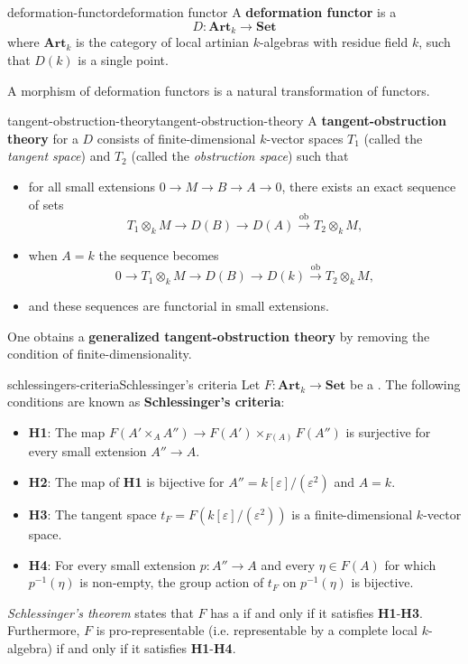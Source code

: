 \begin{topic}{deformation-functor}{deformation functor}
    A \textbf{deformation functor} is a 
    \[ D : \textbf{Art}_k \to \textbf{Set} \]
    where $\textbf{Art}_k$ is the category of local artinian $k$-algebras with residue field $k$, such that $D(k)$ is a single point.
    
    A morphism of deformation functors is a natural transformation of functors.
\end{topic}

\begin{topic}{tangent-obstruction-theory}{tangent-obstruction-theory}
    A \textbf{tangent-obstruction theory} for a  $D$ consists of finite-dimensional $k$-vector spaces $T_1$ (called the \textit{tangent space}) and $T_2$ (called the \textit{obstruction space}) such that
    \begin{itemize}
        \item for all small extensions $0 \to M \to B \to A \to 0$, there exists an exact sequence of sets
        \[ T_1 \otimes_k M \to D(B) \to D(A) \xrightarrow{\text{ob}} T_2 \otimes_k M , \]
        \item when $A = k$ the sequence becomes
        \[ 0 \to T_1 \otimes_k M \to D(B) \to D(k) \xrightarrow{\text{ob}} T_2 \otimes_k M , \]
        \item and these sequences are functorial in small extensions.
    \end{itemize}
    
    One obtains a \textbf{generalized tangent-obstruction theory} by removing the condition of finite-dimensionality.
\end{topic}

\begin{topic}{schlessingers-criteria}{Schlessinger's criteria}
    Let $F : \textbf{Art}_k \to \textbf{Set}$ be a . The following conditions are known as \textbf{Schlessinger's criteria}:
    \begin{itemize}
        \item \textbf{H1}: The map $F(A' \times_A A'') \to F(A') \times_{F(A)} F(A'')$ is surjective for every small extension $A'' \to A$.
        \item \textbf{H2}: The map of \textbf{H1} is bijective for $A'' = k[\varepsilon] / (\varepsilon^2)$ and $A = k$.
        \item \textbf{H3}: The tangent space $t_F = F(k[\varepsilon]/(\varepsilon^2))$ is a finite-dimensional $k$-vector space.
        \item \textbf{H4}: For every small extension $p : A'' \to A$ and every $\eta \in F(A)$ for which $p^{-1}(\eta)$ is non-empty, the group action of $t_F$ on $p^{-1}(\eta)$ is bijective.
    \end{itemize}
    \textit{Schlessinger's theorem} states that $F$ has a  if and only if it satisfies \textbf{H1}-\textbf{H3}. Furthermore, $F$ is pro-representable (i.e. representable by a complete local $k$-algebra) if and only if it satisfies \textbf{H1}-\textbf{H4}.
\end{topic}

